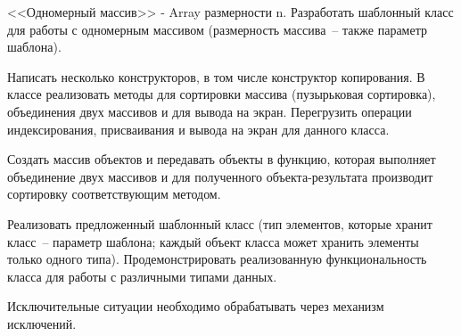<<Одномерный массив>> - Array размерности n. Разработать шаблонный класс для работы
с одномерным массивом (размерность массива~-- также параметр шаблона).

Написать
несколько конструкторов, в том числе конструктор копирования. В классе реализовать
методы для сортировки массива (пузырьковая сортировка), объединения двух массивов и
для вывода на экран. Перегрузить операции индексирования, присваивания и вывода на
экран для данного класса.

Создать массив объектов и передавать объекты в функцию,
которая выполняет объединение двух массивов и для полученного объекта-результата
производит сортировку соответствующим методом.

Реализовать предложенный шаблонный класс (тип элементов, которые
хранит класс~-- параметр шаблона; каждый объект класса может хранить
элементы только одного типа). Продемонстрировать реализованную
функциональность класса для работы с различными типами данных.

Исключительные ситуации необходимо обрабатывать через механизм исключений.
